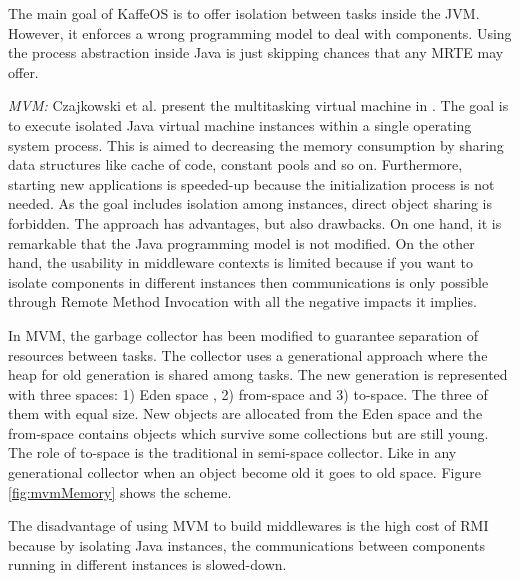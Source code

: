 
The main goal of KaffeOS is to offer isolation between tasks inside the JVM.
However, it enforces a wrong programming model to deal with components.
Using the process abstraction inside Java is just skipping chances that any MRTE may offer.

\emph{MVM:} Czajkowski et al. present the multitasking virtual machine in \cite{czajkowski_multitasking_2001}.
The goal is to execute isolated Java virtual machine instances within a single operating system process.
This is aimed to decreasing the memory consumption by sharing data structures like cache of code, constant pools and so on.
Furthermore, starting new applications is speeded-up because the initialization process is not needed.
As the goal includes isolation among instances, direct object sharing is forbidden.
The approach has advantages, but also drawbacks.
On one hand, it is remarkable that the Java programming model is not modified.
On the other hand, the usability in middleware contexts is limited because if you want to isolate components in different instances then communications is only possible through Remote Method Invocation with all the negative impacts it implies.

In MVM, the garbage collector has been modified to guarantee separation of resources between tasks.
The collector uses a generational approach where the heap for old generation is shared among tasks.
The new generation is represented with three spaces: 1) Eden space , 2) from-space and 3) to-space.
The three of them with equal size.
New objects are allocated from the Eden space and the from-space contains objects which survive some collections but are still young.
The role of to-space is the traditional in semi-space collector. Like in any generational collector when an object become old it goes to old space.
Figure \ref{fig:mvmMemory} shows the scheme.

The disadvantage of using MVM to build middlewares is the high cost of RMI because by isolating Java instances, the communications between components running in different instances is slowed-down.



